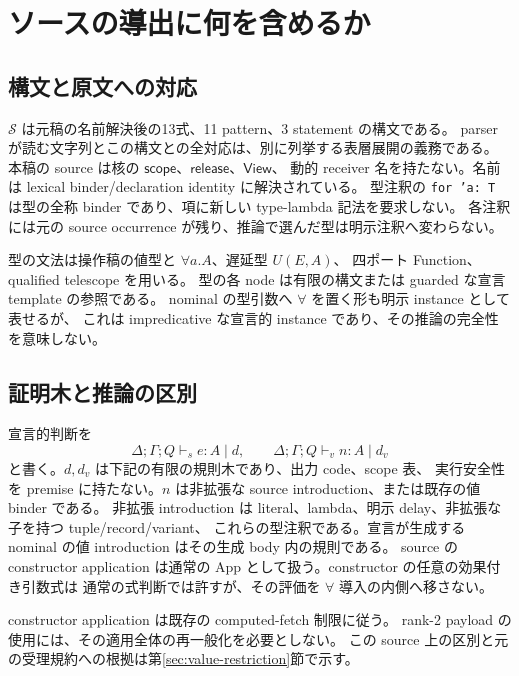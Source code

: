 \documentclass[11pt,a4paper]{article}
\newcommand{\Scope}{\mathsf{scope}}
\newcommand{\Src}{\mathcal S}
\begin{document}
\tableofcontents

\section{ソースの導出に何を含めるか}
\label{sec:source}

\subsection{構文と原文への対応}

\(\Src\) は元稿の名前解決後の13式、11 pattern、3 statement の構文である。
parser が読む文字列とこの構文との全対応は、別に列挙する表層展開の義務である。
本稿の source は核の \(\Scope\)、\(\mathsf{release}\)、\(\mathsf{View}\)、
動的 receiver 名を持たない。名前は lexical binder/declaration identity に解決されている。
型注釈の \texttt{for 'a: T} は型の全称 binder であり、項に新しい type-lambda 記法を要求しない。
各注釈には元の source occurrence が残り、推論で選んだ型は明示注釈へ変わらない。

型の文法は操作稿の値型と \(\forall a.A\)、遅延型 \(U(E,A)\)、
四ポート Function、qualified telescope を用いる。
型の各 node は有限の構文または guarded な宣言 template の参照である。
nominal の型引数へ \(\forall\) を置く形も明示 instance として表せるが、
これは impredicative な宣言的 instance であり、その推論の完全性を意味しない。

\subsection{証明木と推論の区別}

宣言的判断を
\[
 \Delta;\Gamma;Q\vdash_s e:A\mid d,
 \qquad \Delta;\Gamma;Q\vdash_v n:A\mid d_v
\]
と書く。\(d,d_v\) は下記の有限の規則木であり、出力 code、scope 表、
実行安全性を premise に持たない。\(n\) は非拡張な source introduction、または既存の値 binder である。
非拡張 introduction は literal、lambda、明示 delay、非拡張な子を持つ tuple/record/variant、
これらの型注釈である。宣言が生成する nominal の値 introduction はその生成 body 内の規則である。
source の constructor application は通常の App として扱う。constructor の任意の効果付き引数式は
通常の式判断では許すが、その評価を \(\forall\) 導入の内側へ移さない。

constructor application は既存の computed-fetch 制限に従う。
rank-2 payload の使用には、その適用全体の再一般化を必要としない。
この source 上の区別と元の受理規約への根拠は第\ref{sec:value-restriction}節で示す。
\end{document}
